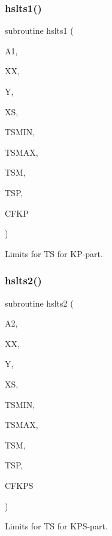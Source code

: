 \subsubsection{\texorpdfstring{hslts1()}{hslts1()}}
{\footnotesize\ttfamily subroutine hslts1 (\begin{DoxyParamCaption}\item[{}]{A1,  }\item[{}]{XX,  }\item[{}]{Y,  }\item[{}]{XS,  }\item[{}]{T\+S\+M\+IN,  }\item[{}]{T\+S\+M\+AX,  }\item[{}]{T\+SM,  }\item[{}]{T\+SP,  }\item[{}]{C\+F\+KP }\end{DoxyParamCaption})}



Limits for TS for K\+P-\/part. 

\mbox{\label{djangoh__h_8f_a1c48c9d9f00ce080540e6074ae6f2464}} 
\subsubsection{\texorpdfstring{hslts2()}{hslts2()}}
{\footnotesize\ttfamily subroutine hslts2 (\begin{DoxyParamCaption}\item[{}]{A2,  }\item[{}]{XX,  }\item[{}]{Y,  }\item[{}]{XS,  }\item[{}]{T\+S\+M\+IN,  }\item[{}]{T\+S\+M\+AX,  }\item[{}]{T\+SM,  }\item[{}]{T\+SP,  }\item[{}]{C\+F\+K\+PS }\end{DoxyParamCaption})}



Limits for TS for K\+P\+S-\/part. 

\mbox{\label{djangoh__h_8f_a889eab824e641752043b6bae2c8aba72}} 
